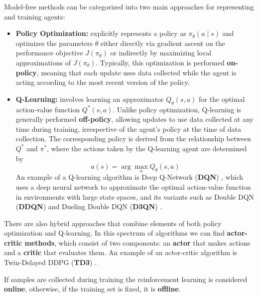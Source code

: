 Model-free methods can be categorized into two main approaches
for representing and training agents:
\begin{itemize}
    \item \textbf{Policy Optimization:} explicitly represents a policy
    as \( \pi_{\theta}(a \mid s) \) and optimizes the parameters \( \theta \)
    either directly via gradient ascent on the performance objective
    \( J(\pi_{\theta}) \) or indirectly by maximizing local approximations
    of \( J(\pi_{\theta}) \).
    Typically, this optimization is performed \textbf{on-policy},
    meaning that each update uses data collected while the agent is acting
    according to the most recent version of the policy.

    \item \textbf{Q-Learning:} involves learning an approximator
    \( Q_{\theta}(s,a) \) for the optimal action-value function \( Q^*(s,a) \).
    Unlike policy optimization, Q-learning is generally performed \textbf{off-policy},
    allowing updates to use data collected at any time during training,
    irrespective of the agent's policy at the time of data collection.
    The corresponding policy is derived from the relationship between
    \( Q^* \) and \( \pi^* \), where the actions taken by the Q-learning
    agent are determined by
    \begin{equation}
    a(s) = \arg \max_a Q_{\theta}(s,a)
    \end{equation}
    An example of a Q-learning algorithm is Deep Q-Network (\textbf{DQN})
    \cite{dqn},
    which uses a deep neural network to approximate the optimal action-value
    function in environments with large state spaces,
    and its variants such as Double DQN (\textbf{DDQN})
    \cite{ddqn} and
    Dueling Double DQN (\textbf{D3QN}) \cite{d3qn}.

\end{itemize}

There are also hybrid approaches that combine elements
of both policy optimization and Q-learning.
In this spectrum of algorithms we can find 
\textbf{actor-critic methods}, which consist of two components:
an \textbf{actor} that makes actions and a \textbf{critic} that evaluates them.
An example of an actor-critic algorithm is Twin-Delayed DDPG (\textbf{TD3})
\cite{td3}.

If samples are collected during training the reinforcement learning is
considered \textbf{online}, otherwise,
if the training set is fixed, it is \textbf{offline}.

